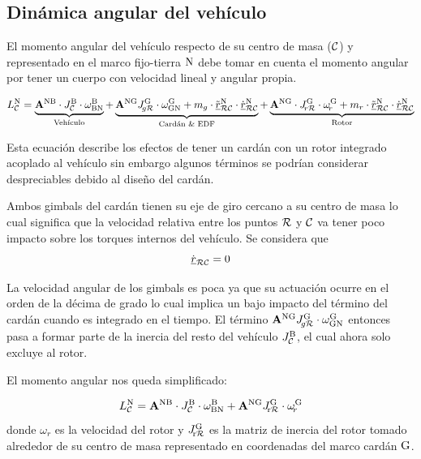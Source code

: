 \subsection{Dinámica angular del vehículo} \label{ssec:ecuacionangular}


El momento angular del vehículo respecto de su centro de masa ($\mathcal{C}$) y representado en el marco fijo-tierra $\mathrm{N}$ debe tomar en cuenta el momento angular por tener un cuerpo con velocidad lineal y angular propia. 

\begin{equation}
		L_{\mathcal{C}}^{\mathrm{N}} = \underbrace{\mathbf{A}^{\mathrm{{NB}}} \cdot J_{\mathcal{C}}^{\mathrm{B}} \cdot \omega_{\mathrm{BN}}^{\mathrm{B}}}_{\text{Vehículo}} + \underbrace{\mathbf{A}^{\mathrm{{NG}}}J_{\!g\mathcal{R}}^{\mathrm{G}} \cdot \omega_{\mathrm{GN}}^{\mathrm{G}} +
		 m_{g}\cdot \tilde{{ \underline{r} }}^{\mathrm{N}}_{\mathcal{RC}} \cdot\dot{{ \underline{r} }}^{\mathrm{N}}_{\mathcal{RC}} }_\text{Cardán \& EDF} + \underbrace{ \mathbf{A}^{\mathrm{NG}} \cdot J_{\!r\mathcal{R}}^{\mathrm{G}} \cdot \omega_{\!r}^{\mathrm{G}} + m_{r}\cdot \tilde{{ \underline{r} }}^{\mathrm{N}}_{\mathcal{RC}} \cdot\dot{{ \underline{r} }}^{\mathrm{N}}_{\mathcal{RC}}}_\text{Rotor}
\end{equation}

Esta ecuación describe los efectos de tener un cardán con un rotor integrado acoplado al vehículo sin embargo algunos términos se podrían considerar despreciables debido al diseño del cardán. 

Ambos gimbals del cardán tienen su eje de giro cercano a su centro de masa lo cual significa que la velocidad relativa entre los puntos $\mathcal{R}$ y $\mathcal{C}$ va tener poco impacto sobre los torques internos del vehículo. Se considera que
\begin{equation}
\dot{{ \underline{r} }}_{\mathcal{RC}}  = 0
\end{equation}

La velocidad angular de los gimbals es poca ya que su actuación ocurre en el orden de la décima de grado lo cual implica un bajo impacto del término del cardán cuando es integrado en el tiempo. El término  $\mathbf{A}^{\mathrm{{NG}}}J_{\!g\mathcal{R}}^{\mathrm{G}} \cdot \omega_{\mathrm{GN}}^{\mathrm{G}}$ entonces pasa a formar parte de la inercia del resto del vehículo $J_{\mathcal{C}}^{\mathrm{B}}$, el cual ahora solo excluye al rotor.



El momento angular nos queda simplificado:


\begin{equation}
	L_{\mathcal{C}}^{\mathrm{N}} = \mathbf{A}^{\mathrm{{NB}}} \cdot J_{\mathcal{C}}^{\mathrm{B}} \cdot \omega_{\mathrm{BN}}^{\mathrm{B}} +\mathbf{A}^{\mathrm{NG}} J_{\mathcal{\!\mathrm{r}R}}^{\mathrm{G}} \cdot \omega_{\!r}^{\mathrm{G}}
\end{equation}
donde $\omega_{\!r}$ es la velocidad del rotor y $J_{\mathcal{\!\mathrm{r}R}}^{\mathrm{G}}$ es la matriz de inercia del rotor tomado alrededor de su centro de masa representado en coordenadas del marco cardán $\mathrm{G}$.


